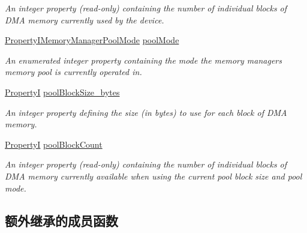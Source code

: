 \begin{DoxyCompactItemize}
\begin{DoxyCompactList}\small\item\em An integer property {\bfseries }(read-\/only) containing the number of individual blocks of D\+M\+A memory currently used by the device. \end{DoxyCompactList}\item 
\hyperlink{group___device_specific_interface_gae8ead74d2d3b067021f1eb34ecc16dd1}{Property\+I\+Memory\+Manager\+Pool\+Mode} \hyperlink{classmv_i_m_p_a_c_t_1_1acquire_1_1_image_memory_manager_a79a4b7dd428194879403ea8f328b0c42}{pool\+Mode}
\begin{DoxyCompactList}\small\item\em An enumerated integer property containing the mode the memory managers memory pool is currently operated in. \end{DoxyCompactList}\item 
\hypertarget{classmv_i_m_p_a_c_t_1_1acquire_1_1_image_memory_manager_afd2cb81aa370b57456a730b773616649}{\hyperlink{group___common_interface_ga12d5e434238ca242a1ba4c6c3ea45780}{Property\+I} \hyperlink{classmv_i_m_p_a_c_t_1_1acquire_1_1_image_memory_manager_afd2cb81aa370b57456a730b773616649}{pool\+Block\+Size\+\_\+bytes}}\label{classmv_i_m_p_a_c_t_1_1acquire_1_1_image_memory_manager_afd2cb81aa370b57456a730b773616649}

\begin{DoxyCompactList}\small\item\em An integer property defining the size (in bytes) to use for each block of D\+M\+A memory. \end{DoxyCompactList}\item 
\hypertarget{classmv_i_m_p_a_c_t_1_1acquire_1_1_image_memory_manager_a8c374420eafcce4edcd1fee4ebe35f1b}{\hyperlink{group___common_interface_ga12d5e434238ca242a1ba4c6c3ea45780}{Property\+I} \hyperlink{classmv_i_m_p_a_c_t_1_1acquire_1_1_image_memory_manager_a8c374420eafcce4edcd1fee4ebe35f1b}{pool\+Block\+Count}}\label{classmv_i_m_p_a_c_t_1_1acquire_1_1_image_memory_manager_a8c374420eafcce4edcd1fee4ebe35f1b}

\begin{DoxyCompactList}\small\item\em An integer property {\bfseries }(read-\/only) containing the number of individual blocks of D\+M\+A memory currently available when using the current pool block size and pool mode. \end{DoxyCompactList}\end{DoxyCompactItemize}
\subsection*{额外继承的成员函数}


